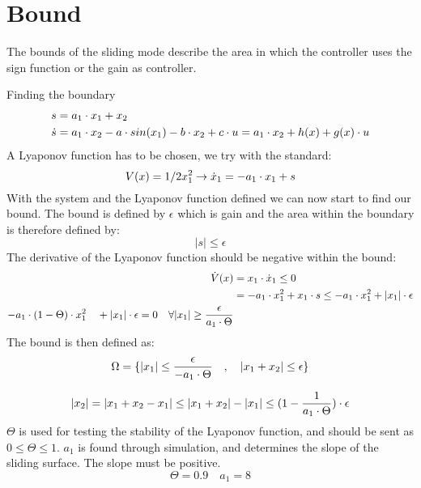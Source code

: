\section{Bound} %
\label{sec:bound}
The bounds of the sliding mode describe the area in which the controller uses the sign function or the gain as controller.

Finding the boundary
\begin{equation}
\begin{split}
        s &= a_1 \cdot x_1 + x_2 \\
        \dot{s} &= a_1 \cdot x_2 - a \cdot sin(x_1) - b \cdot x_2 + c \cdot u = a_1 \cdot x_2 + h(x) + g(x) \cdot u
\end{split}
\end{equation}
A Lyaponov function has to be chosen, we try with the standard:
\begin{equation}
        V(x) = 1/2 x_1^2 \rightarrow \dot{x}_1 = -a_1 \cdot x_1 + s
\end{equation}
With the system and the Lyaponov function defined we can now start to find our bound. The bound is defined by $\epsilon$ which is gain and the area within the boundary is therefore defined by:
\begin{equation}
        \vert s \vert \leq \epsilon
\end{equation}
The derivative of the Lyaponov function should be negative within the bound:
\begin{equation}
        \begin{split}
                \dot{V}(x) &= x_1 \cdot \dot{x}_1 \leq 0 \\
                &= -a_1 \cdot x_1^2 + x_1 \cdot s \leq -a_1 \cdot x_1^2 + |x_1| \cdot \epsilon \\
                 -a_1 \cdot (1-\Theta) \cdot x_1^2 \quad +\vert x_1 \vert \cdot \epsilon = 0 \quad\forall |x_1| \geq \frac{\epsilon}{a_1 \cdot \Theta}
        \end{split}
\end{equation}
The bound is then defined as:
\begin{equation}
        \Omega = \{ |x_1| \leq \frac{\epsilon}{-a_1 \cdot \Theta} \quad , \quad |x_1 + x_2| \leq \epsilon \}
\end{equation}

\begin{equation}
        |x_2| = |x_1 + x_2 - x_1| \leq |x_1 + x_2| - |x_1| \leq (1 - \frac{1}{a_1 \cdot \Theta}) \cdot \epsilon
\end{equation}
$\Theta$ is used for testing the stability of the Lyaponov function, and should be sent as $0 \leq \Theta \leq 1$. $a_1$ is found through simulation, and determines the slope of the sliding surface. The slope must be positive.
\begin{equation}
        \Theta = 0.9 \quad a_1 = 8
\end{equation}

